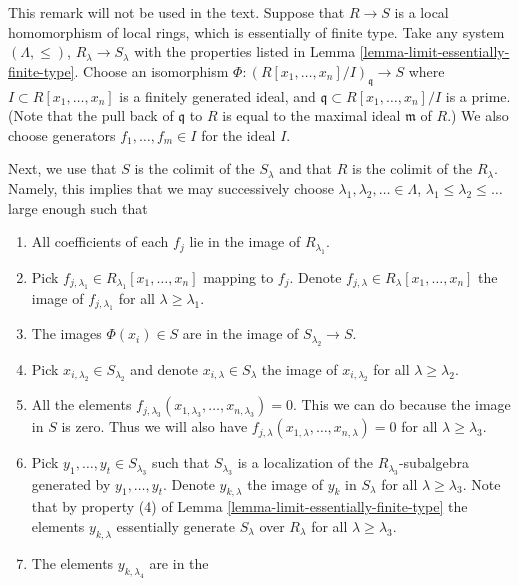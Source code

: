 \begin{remark}
\label{remark-suitable-systems-limits}
This remark will not be used in the text.
Suppose that $R \to S$ is a local homomorphism
of local rings, which is essentially of finite type.
Take any system $(\Lambda, \leq)$, $R_\lambda \to S_\lambda$
with the properties listed in
Lemma \ref{lemma-limit-essentially-finite-type}.
Choose an isomorphism
$\Phi : (R[x_1,\ldots, x_n]/I)_{\mathfrak q} \to S$
where $I \subset R[x_1,\ldots,x_n]$ is a finitely generated ideal,
and $\mathfrak q \subset R[x_1,\ldots, x_n]/I$ is a prime.
(Note that the pull back of $\mathfrak q$ to $R$
is equal to the maximal ideal $\mathfrak m$ of $R$.)
We also choose generators $f_1,\ldots, f_m \in I$ for
the ideal $I$.

\medskip\noindent
Next, we use that $S$ is the colimit of the $S_\lambda$
and that $R$ is the colimit of the $R_\lambda$.
Namely, this implies that we may successively choose
$\lambda_1, \lambda_2, \ldots \in \Lambda$,
$\lambda_1 \leq \lambda_2 \leq \ldots$ large enough such that
\begin{enumerate}
\item All coefficients of each $f_j$ lie in the image of
$R_{\lambda_1}$.
\item Pick $f_{j, \lambda_1} \in R_{\lambda_1}[x_1,\ldots, x_n]$
mapping to $f_j$. Denote $f_{j, \lambda} \in R_\lambda[x_1,\ldots, x_n]$
the image of $f_{j, \lambda_1}$ for all $\lambda \geq \lambda_1$.
\item The images $\Phi(x_i) \in S$ are in the image of
$S_{\lambda_2} \to S$.
\item Pick $x_{i, \lambda_2} \in S_{\lambda_2}$
and denote $x_{i, \lambda} \in S_{\lambda}$ the image of
$x_{i, \lambda_2}$ for all $\lambda \geq \lambda_2$.
\item All the elements
$f_{j, \lambda_3}(x_{1,\lambda_3},\ldots, x_{n, \lambda_3}) = 0$.
This we can do because the image in $S$ is zero.
Thus we will also have
$f_{j, \lambda}(x_{1,\lambda},\ldots, x_{n, \lambda}) = 0$
for all $\lambda \geq \lambda_3$.
\item Pick $y_1,\ldots,y_t \in S_{\lambda_3}$
such that $S_{\lambda_3}$ is a localization of the
$R_{\lambda_3}$-subalgebra generated by $y_1,\ldots,y_t$.
Denote $y_{k, \lambda}$ the image of $y_k$ in $S_\lambda$
for all $\lambda \geq \lambda_3$.
Note that by property (4) of
Lemma \ref{lemma-limit-essentially-finite-type}
the elements $y_{k, \lambda}$ essentially generate
$S_{\lambda}$ over $R_\lambda$ for all $\lambda \geq \lambda_3$.
\item The elements $y_{k, \lambda_4}$ are in the

\end{enumerate}
\end{remark}

